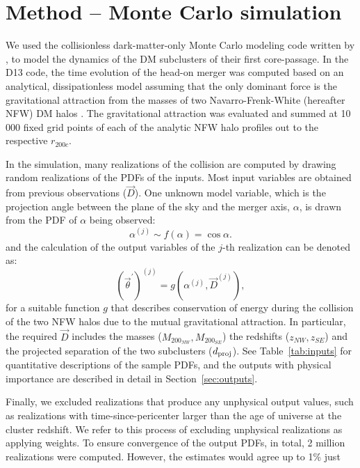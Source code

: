 \section{Method -- Monte Carlo simulation} 
\label{sec:method}
We used the collisionless 
dark-matter-only Monte Carlo modeling code written by , to
model the dynamics of the DM subclusters of their first core-passage.
In the D13 code, the time evolution of the
head-on merger was computed based on an analytical, dissipationless model
assuming that the only dominant force is the gravitational attraction from
the masses of two Navarro-Frenk-White (hereafter NFW) DM halos
\citep{Navarro96}. 
The gravitational attraction was evaluated and summed at 10 000 fixed grid
points of each of the analytic NFW halo profiles out to the respective
$r_{200c}$.\par
In the simulation, many realizations of the collision are
computed by drawing random realizations of the PDFs of the inputs. Most
input variables are obtained from previous observations ($\vec{D}$).  One
unknown model variable, which is the projection angle between the plane of the sky
and the merger axis, $\alpha$, is drawn from the PDF of $\alpha$ being
observed: 
\begin{equation}
	\alpha^{(j)} \sim f(\alpha) = \cos \alpha.
\end{equation}
and the calculation of the output variables of the $j$-th realization can be denoted as: 
\begin{equation}
	(\vec{\theta}^\prime)^{(j)} = g(\alpha^{(j)}, \vec{D}^{(j)}), 
\end{equation}    
for a suitable function $g$ that describes conservation of energy during
the collision of the two NFW halos due to the mutual gravitational
attraction.  In particular, the required $\vec{D}$ includes the masses ($M_{200_{NW}},M_{200_{SE}}$) the redshifts ($z_{NW}, z_{SE}$) and the
projected separation of the two subclusters ($d_{\rm proj}$).  See
Table~\ref{tab:inputs} for quantitative descriptions of the sample PDFs, and
the outputs with physical importance are described in detail in Section~\ref{sec:outputs}. \par
Finally, we excluded realizations that produce any unphysical output
values, such as realizations with time-since-pericenter larger than the age of universe at the
cluster redshift.  We refer to this process of excluding unphysical
realizations as applying weights. 
To ensure convergence of the output PDFs, in total, 2 million realizations
were computed. However, the estimates would agree up to 1\% just 
